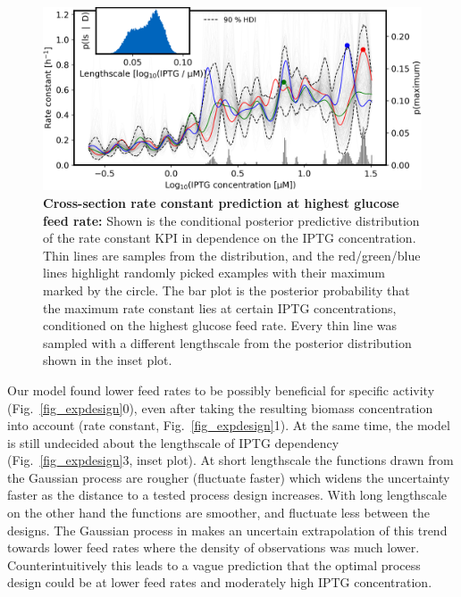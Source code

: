 \documentclass[sn-standardnature]{sn-jnl}%
\theoremstyle{thmstyleone}%
\theoremstyle{thmstyletwo}%
\theoremstyle{thmstylethree}%
\begin{document}
\begin{figure}[h]
    \centering
    \includegraphics[width=1.0\textwidth]{figures/plot_pp_dense_dense_k_design_crossection.png}
    \caption{
        \textbf{Cross-section rate constant prediction at highest glucose feed rate:}
        Shown is the conditional posterior predictive distribution of the rate constant KPI in dependence on the IPTG concentration.
        Thin lines are samples from the distribution, and the red/green/blue lines highlight randomly picked examples with their maximum marked by the circle.
        The bar plot is the posterior probability that the maximum rate constant lies at certain IPTG concentrations, conditioned on the highest glucose feed rate.
        Every thin line was sampled with a different lengthscale from the posterior distribution shown in the inset plot.
    }
    \label{fig_kdesign_crossection}
\end{figure}

Our model found lower feed rates to be possibly beneficial for specific activity (Fig.~\ref{fig_expdesign}0), even after taking the resulting biomass concentration into account (rate constant, Fig.~\ref{fig_expdesign}1).
At the same time, the model is still undecided about the lengthscale of IPTG dependency (Fig.~\ref{fig_expdesign}3, inset plot).
At short lengthscale the functions drawn from the Gaussian process are rougher (fluctuate faster) which widens the uncertainty faster as the distance to a tested  process design increases.
With long lengthscale on the other hand the functions are smoother, and fluctuate less between the designs.
The Gaussian process in makes an uncertain extrapolation of this trend towards lower feed rates where the density of observations was much lower.
Counterintuitively this leads to a vague prediction that the optimal process design could be at lower feed rates and moderately high IPTG concentration.
\end{document}
